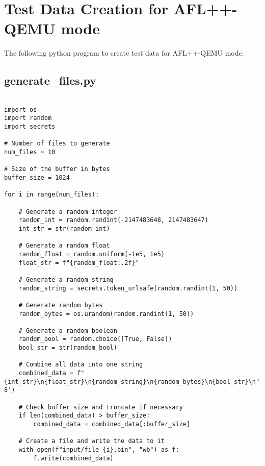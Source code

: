 \vspace{21.5pt}
\clearpage

\chapter{Test Data Creation for AFL++-QEMU mode}\label{appx:third}
The following python program to create test data for AFL++-QEMU mode.

\section*{generate\_files.py}

\begin{verbatim}

import os
import random
import secrets

# Number of files to generate
num_files = 10

# Size of the buffer in bytes
buffer_size = 1024

for i in range(num_files):

    # Generate a random integer
    random_int = random.randint(-2147483648, 2147483647)
    int_str = str(random_int)

    # Generate a random float
    random_float = random.uniform(-1e5, 1e5)
    float_str = f"{random_float:.2f}"

    # Generate a random string
    random_string = secrets.token_urlsafe(random.randint(1, 50))

    # Generate random bytes
    random_bytes = os.urandom(random.randint(1, 50))

    # Generate a random boolean
    random_bool = random.choice([True, False])
    bool_str = str(random_bool)

    # Combine all data into one string
    combined_data = f"{int_str}\n{float_str}\n{random_string}\n{random_bytes}\n{bool_str}\n".encode('utf-8')

    # Check buffer size and truncate if necessary
    if len(combined_data) > buffer_size:
        combined_data = combined_data[:buffer_size]

    # Create a file and write the data to it
    with open(f"input/file_{i}.bin", "wb") as f:
        f.write(combined_data)

\end{verbatim}
\label{lst:python_code_qemu}
